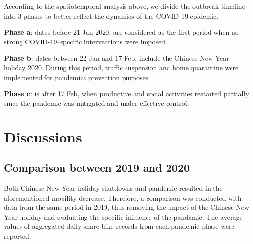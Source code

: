 \documentclass[ijgi,submit,moreauthors,pdftex]{Definitions/mdpi}
\begin{document}
According to the spatiotemporal analysis above, we divide the outbreak timeline into 3 phases to better reflect the dynamics of the COVID-19 epidemic.

\textbf{Phase a}: dates before 21 Jan 2020, are considered as the first period when no strong COVID-19–specific interventions were imposed.

\textbf{Phase b}: dates between 22 Jan and 17 Feb, include the Chinese New Year holiday 2020. During this period, traffic suspension and home quarantine were implemented for pandemics prevention purposes.

\textbf{Phase c}: is after 17 Feb, when productive and social activities restarted partially since the pandemic was mitigated and under effective control.


\section{Discussions}
\subsection{Comparison between 2019 and 2020}%

Both Chinese New Year holiday shutdowns and pandemic resulted in the aforementioned mobility decrease.
Therefore, a comparison was conducted with data from the same period in 2019, thus removing the impact of the Chinese New Year holiday and evaluating the specific influence of the pandemic.  
The average values of aggregated daily share bike records from each pandemic phase were reported.
\end{document}

